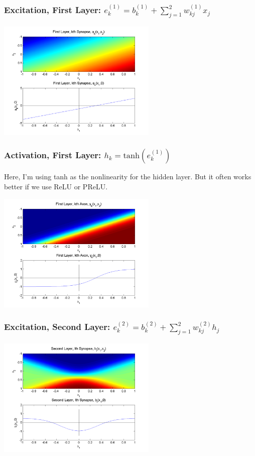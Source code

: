 \documentclass{beamer}
\begin{document}
\begin{frame}
  \frametitle{Excitation, First Layer: $e_k^{(1)}=b_{k}^{(1)}+\sum_{j=1}^2 w_{kj}^{(1)}x_j$}
  \centerline{\includegraphics[width=3in]{../lec07/figs/nn_synapse1.png}}
\end{frame}

\begin{frame}
  \frametitle{Activation, First Layer: $h_k=\mbox{tanh}(e_k^{(1)})$}

  Here, I'm using tanh as the nonlinearity for the hidden layer.  But
  it often works better if we use ReLU or PReLU.
  
  \centerline{\includegraphics[width=3in]{../lec07/figs/nn_axon1.png}}
\end{frame}

\begin{frame}
  \frametitle{Excitation, Second Layer: $e_k^{(2)}=b_{k}^{(2)}+\sum_{j=1}^2w_{kj}^{(2)}h_j$}
  \centerline{\includegraphics[width=3in]{../lec07/figs/nn_synapse2.png}}
\end{frame}
\end{document}
